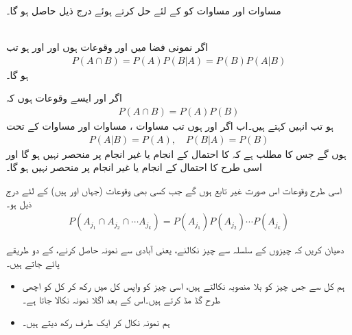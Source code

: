 مساوات  اور مساوات  کو  کے لئے حل کرتے ہوئے درج ذیل حاصل ہو گا۔

\quad {}\\
اگر نمونی فضا  میں  اور  وقوعات ہوں اور  اور  ہو تب 
\begin{align}\label{مساوات_شماریات_مشروط_احتمال_پ}
P(A\cap B)=P(A)P(B|A)=P(B)P(A|B)
\end{align}
ہو گا۔

اگر  اور  ایسے وقوعات ہوں کہ 
\begin{align}\label{مساوات_شماریات_مشروط_احتمال_ت}
P(A\cap B)=P(A)P(B)
\end{align}
ہو تب انہیں  کہتے ہیں۔اب اگر  اور  ہوں تب مساوات ، مساوات  اور مساوات  کے تحت 
\begin{align*}
P(A|B)=P(A),\quad P(B|A)=P(B)
\end{align*}
ہوں گے جس کا مطلب ہے کہ  کا احتمال  کے انجام یا غیر انجام پر منحصر نہیں ہو گا اور اسی طرح  کا احتمال  کے انجام یا غیر انجام پر منحصر نہیں ہو گا۔

اسی طرح  وقوعات  اس صورت غیر تابع ہوں گے جب کسی  بھی  وقوعات  (جہاں  اور  ہیں) کے لئے درج ذیل ہو۔
\begin{align}
P(A_{j_1}\cap A_{j_2}\cap \cdots A_{j_k})=P(A_{j_1})P(A_{j_2})\cdots P(A_{j_k})
\end{align}

دھیان کریں کہ  چیزوں کے سلسلہ سے چیز نکالنے، یعنی آبادی سے نمونہ حاصل کرنے، کے دو طریقے پائے جاتے ہیں۔
\begin{itemize}
\item {}
ہم کل سے جس چیز کو بلا منصوبہ نکالتے ہیں، اسی چیز کو واپس کل میں رکھ کر کل کو اچھی طرح  گڈ مڈ کرتے ہیں۔اس کے بعد اگلا نمونہ نکالا جاتا ہے۔
\item{}
ہم نمونہ نکال کر ایک طرف رکھ دیتے ہیں۔
\end{itemize}


